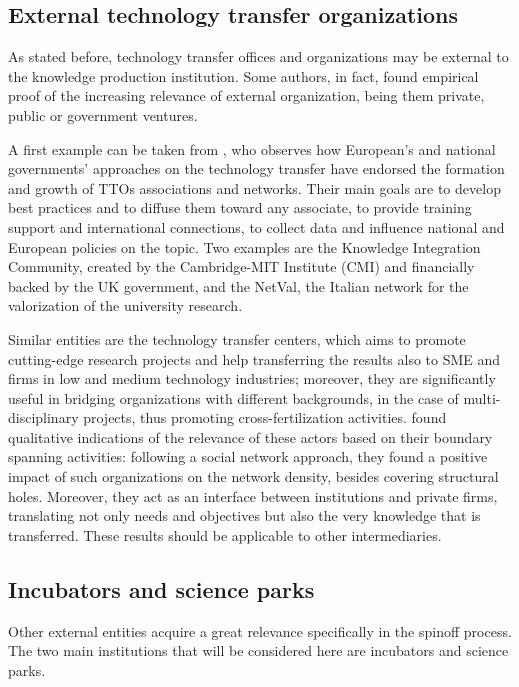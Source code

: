 \subsection{External technology transfer organizations}

As stated before, technology transfer offices and organizations may be external to the knowledge production institution. Some authors, in fact, found empirical proof of the increasing relevance of external organization, being them private, public or government ventures.

A first example can be taken from \citet{Geuna2009}, who observes how European's and national governments' approaches on the technology transfer have endorsed the formation and growth of TTOs associations and networks. Their main goals are to develop best practices and to diffuse them toward any associate, to provide training support and international connections, to collect data and influence national and European policies on the topic. Two examples are the Knowledge Integration Community, created by the Cambridge-MIT Institute (CMI) and financially backed by the UK government, and the NetVal, the Italian network for the valorization of the university research.

Similar entities are the technology transfer centers, which aims to promote cutting-edge research projects and help transferring the results also to SME and firms in low and medium technology industries; moreover, they are significantly useful in bridging organizations with different backgrounds, in the case of multi-disciplinary projects, thus promoting cross-fertilization activities. \citet{Comacchio2012} found qualitative indications of the relevance of these actors based on their boundary spanning activities: following a social network approach, they found a positive impact of such organizations on the network density, besides covering structural holes. Moreover, they act as an interface between institutions and private firms, translating not only needs and objectives but also the very knowledge that is transferred. These results should be applicable to other intermediaries.

\subsection{Incubators and science parks}
Other external entities acquire a great relevance specifically in the spinoff process. The two main institutions that will be considered here are incubators and science parks. 

